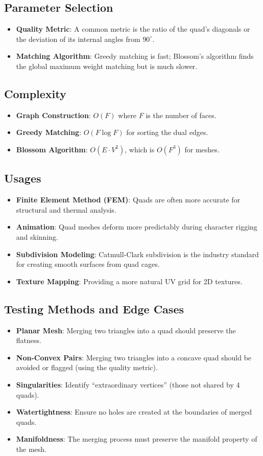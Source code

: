\subsection{Parameter Selection}
\begin{itemize}
\item \textbf{Quality Metric}: A common metric is the ratio of the quad's diagonals or the deviation of its internal angles from $90^\circ$.
\item \textbf{Matching Algorithm}: Greedy matching is fast; Blossom's algorithm finds the global maximum weight matching but is much slower.
\end{itemize}

\subsection{Complexity}
\begin{itemize}
\item \textbf{Graph Construction}: $O(F)$ where $F$ is the number of faces.
\item \textbf{Greedy Matching}: $O(F \log F)$ for sorting the dual edges.
\item \textbf{Blossom Algorithm}: $O(E \cdot V^2)$, which is $O(F^3)$ for meshes.
\end{itemize}

\subsection{Usages}
\begin{itemize}
\item \textbf{Finite Element Method (FEM)}: Quads are often more accurate for structural and thermal analysis.
\item \textbf{Animation}: Quad meshes deform more predictably during character rigging and skinning.
\item \textbf{Subdivision Modeling}: Catmull-Clark subdivision is the industry standard for creating smooth surfaces from quad cages.
\item \textbf{Texture Mapping}: Providing a more natural UV grid for 2D textures.
\end{itemize}

\subsection{Testing Methods and Edge Cases}
\begin{itemize}
\item \textbf{Planar Mesh}: Merging two triangles into a quad should preserve the flatness.
\item \textbf{Non-Convex Pairs}: Merging two triangles into a concave quad should be avoided or flagged (using the quality metric).
\item \textbf{Singularities}: Identify ``extraordinary vertices'' (those not shared by 4 quads).
\item \textbf{Watertightness}: Ensure no holes are created at the boundaries of merged quads.
\item \textbf{Manifoldness}: The merging process must preserve the manifold property of the mesh.
\end{itemize}

